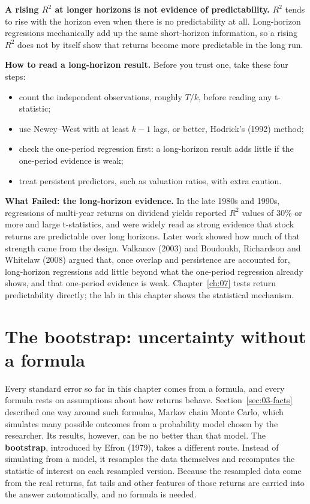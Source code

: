 \textbf{A rising $R^2$ at longer horizons is not evidence of predictability.} $R^2$ tends to rise with the horizon
even when there is no predictability at all. Long-horizon regressions
mechanically add up the same short-horizon information, so a rising $R^2$ does
not by itself show that returns become more predictable in the long run.

\textbf{How to read a long-horizon result.} Before you trust one, take these four steps:

\begin{itemize}
  \item count the independent observations, roughly $T/k$, before reading any t-statistic;
  \item use Newey--West with at least $k-1$ lags, or better, Hodrick's (1992) method;
  \item check the one-period regression first: a long-horizon result adds little if the one-period evidence is weak;
  \item treat persistent predictors, such as valuation ratios, with extra caution.
\end{itemize}

\begin{callout}
\textbf{What Failed: the long-horizon evidence.} In the late 1980s and 1990s, regressions of multi-year returns on dividend yields reported $R^2$ values of 30\% or more and large t-statistics, and were widely read as strong evidence that stock returns are predictable over long horizons. Later work showed how much of that strength came from the design. Valkanov (2003) and Boudoukh, Richardson and Whitelaw (2008) argued that, once overlap and persistence are accounted for, long-horizon regressions add little beyond what the one-period regression already shows, and that one-period evidence is weak. Chapter~\ref{ch:07} tests return predictability directly; the lab in this chapter shows the statistical mechanism.
\end{callout}

\section{The bootstrap: uncertainty without a formula}
\label{sec:03-bootstrap}

Every standard error so far in this chapter comes from a formula, and every formula rests on assumptions about how returns behave. Section~\ref{sec:03-facts} described one way around such formulas, Markov chain Monte Carlo, which simulates many possible outcomes from a probability model chosen by the researcher. Its results, however, can be no better than that model. The \textbf{bootstrap}, introduced by Efron (1979), takes a different route. Instead of simulating from a model, it resamples the data themselves and recomputes the statistic of interest on each resampled version. Because the resampled data come from the real returns, fat tails and other features of those returns are carried into the answer automatically, and no formula is needed.

